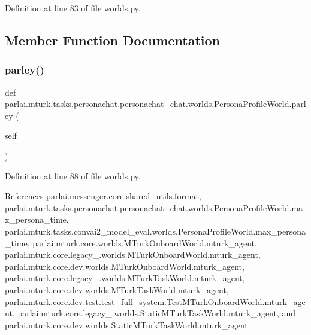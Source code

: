Definition at line 83 of file worlds.\+py.



\subsection{Member Function Documentation}
\mbox{\label{classparlai_1_1mturk_1_1tasks_1_1personachat_1_1personachat__chat_1_1worlds_1_1PersonaProfileWorld_a7c44d8255de135cf0539ad1ef14ae05d}} 
\subsubsection{\texorpdfstring{parley()}{parley()}}
{\footnotesize\ttfamily def parlai.\+mturk.\+tasks.\+personachat.\+personachat\+\_\+chat.\+worlds.\+Persona\+Profile\+World.\+parley (\begin{DoxyParamCaption}\item[{}]{self }\end{DoxyParamCaption})}



Definition at line 88 of file worlds.\+py.



References parlai.\+messenger.\+core.\+shared\+\_\+utils.\+format, parlai.\+mturk.\+tasks.\+personachat.\+personachat\+\_\+chat.\+worlds.\+Persona\+Profile\+World.\+max\+\_\+persona\+\_\+time, parlai.\+mturk.\+tasks.\+convai2\+\_\+model\+\_\+eval.\+worlds.\+Persona\+Profile\+World.\+max\+\_\+persona\+\_\+time, parlai.\+mturk.\+core.\+worlds.\+M\+Turk\+Onboard\+World.\+mturk\+\_\+agent, parlai.\+mturk.\+core.\+legacy\+\_.\+worlds.\+M\+Turk\+Onboard\+World.\+mturk\+\_\+agent, parlai.\+mturk.\+core.\+dev.\+worlds.\+M\+Turk\+Onboard\+World.\+mturk\+\_\+agent, parlai.\+mturk.\+core.\+legacy\+\_.\+worlds.\+M\+Turk\+Task\+World.\+mturk\+\_\+agent, parlai.\+mturk.\+core.\+dev.\+worlds.\+M\+Turk\+Task\+World.\+mturk\+\_\+agent, parlai.\+mturk.\+core.\+dev.\+test.\+test\+\_\+full\+\_\+system.\+Test\+M\+Turk\+Onboard\+World.\+mturk\+\_\+agent, parlai.\+mturk.\+core.\+legacy\+\_.\+worlds.\+Static\+M\+Turk\+Task\+World.\+mturk\+\_\+agent, and parlai.\+mturk.\+core.\+dev.\+worlds.\+Static\+M\+Turk\+Task\+World.\+mturk\+\_\+agent.



